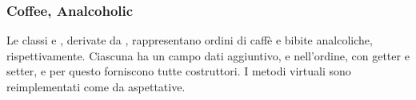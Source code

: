 \subsubsection{Coffee, Analcoholic} %
\label{ssub:coffe_analcoholic}
Le classi  e , derivate da , rappresentano ordini di caffè e bibite analcoliche, rispettivamente. Ciascuna ha un campo dati aggiuntivo,  e  nell'ordine, con getter e setter, e per questo forniscono tutte costruttori. I metodi virtuali sono reimplementati come da aspettative.
